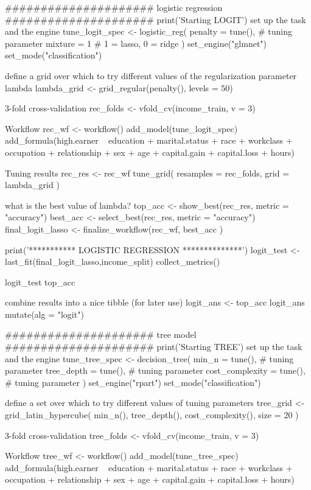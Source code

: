 \documentclass{article}
\begin{document}
#####################
logistic regression
#####################
print('Starting LOGIT')
set up the task and the engine
tune_logit_spec <- logistic_reg(
  penalty = tune(), # tuning parameter
  mixture = 1       # 1 = lasso, 0 = ridge
) %
  set_engine("glmnet") %
  set_mode("classification")

define a grid over which to try different values of the regularization parameter lambda
lambda_grid <- grid_regular(penalty(), levels = 50)

3-fold cross-validation
rec_folds <- vfold_cv(income_train, v = 3)

 Workflow
rec_wf <- workflow() %
  add_model(tune_logit_spec) %
  add_formula(high.earner ~ education + marital.status + race + workclass + occupation + relationship + sex + age + capital.gain + capital.loss + hours)

Tuning results
rec_res <- rec_wf %
  tune_grid(
    resamples = rec_folds,
    grid = lambda_grid
  )

what is the best value of lambda?
top_acc  <- show_best(rec_res, metric = "accuracy")
best_acc <- select_best(rec_res, metric = "accuracy")
final_logit_lasso <- finalize_workflow(rec_wf,
                                       best_acc
)

print('*********** LOGISTIC REGRESSION **************')
logit_test <- last_fit(final_logit_lasso,income_split) %
  collect_metrics()

logit_test %
top_acc %

combine results into a nice tibble (for later use)
logit_ans <- top_acc %
logit_ans %
  mutate(alg = "logit") %



#####################
tree model
#####################
print('Starting TREE')
set up the task and the engine
tune_tree_spec <- decision_tree(
  min_n = tune(), # tuning parameter
  tree_depth = tune(), # tuning parameter
  cost_complexity = tune(), # tuning parameter
) %
  set_engine("rpart") %
  set_mode("classification")

define a set over which to try different values of tuning parameters
tree_grid <- grid_latin_hypercube(
  min_n(),
  tree_depth(),
  cost_complexity(),
  size = 20
)

3-fold cross-validation
tree_folds <- vfold_cv(income_train, v = 3)

Workflow
tree_wf <- workflow() %
  add_model(tune_tree_spec) %
  add_formula(high.earner ~ education + marital.status + race + workclass + occupation + relationship + sex + age + capital.gain + capital.loss + hours)
\end{document}
